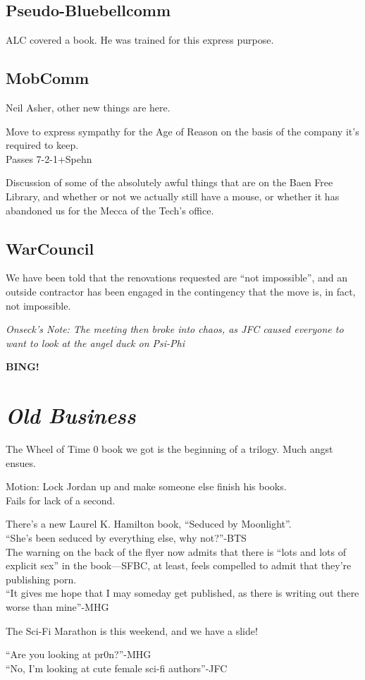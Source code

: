 \documentclass[10pt]{article}
\newcommand{\bing}{{\bf BING!} }
\newcommand{\goto}[1]{\bing \vskip 12pt \section*{{\em{#1}}}}
\begin{document}
\subsection*{Pseudo-Bluebellcomm}
ALC covered a book. He was trained for this express purpose.

\subsection*{MobComm}
Neil Asher, other new things are here. 

Move to express sympathy for the Age of Reason on the basis of the
company it's required to keep.\\
Passes 7-2-1+Spehn

Discussion of some of the absolutely awful things that are on the Baen
Free Library, and whether or not we actually still have a mouse, or
whether it has abandoned us for the Mecca of the Tech's office.

\subsection*{WarCouncil}
We have been told that the renovations requested are ``not
impossible'', and an outside contractor has been engaged in the
contingency that the move is, in fact, not impossible.

\emph{Onseck's Note: The meeting then broke into chaos, as JFC caused
  everyone to want  to look at the angel duck on Psi-Phi}

\goto{Old Business}
The Wheel of Time 0 book we got is the beginning of a trilogy.  Much
angst ensues.

Motion: Lock Jordan up and make someone else finish his books.\\
Fails for lack of a second.

There's a new Laurel K. Hamilton book, ``Seduced by Moonlight''.\\
``She's been seduced by everything else, why not?''-BTS\\
The warning on the back of the flyer now admits that there is ``lots
and lots of explicit sex'' in the book---SFBC, at least, feels
compelled to admit that they're publishing porn. \\
``It gives me hope that I may someday get published, as there is
writing out there worse than mine''-MHG

The Sci-Fi Marathon is this weekend, and we have a slide!

``Are you looking at pr0n?''-MHG\\
``No, I'm looking at cute female sci-fi authors''-JFC
\end{document}

